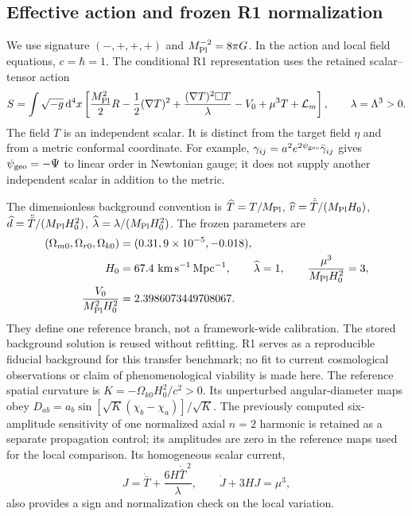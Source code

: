 \subsection{Effective action and frozen R1 normalization}
We use signature $(-,+,+,+)$ and $M_{\rm Pl}^{-2}=8\pi G$.
In the action and local field equations, $c=\hbar=1$.
The conditional R1 representation uses the retained scalar--tensor action
\begin{equation}
 S=\int \sqrt{-g}\,\mathrm d^4x\left[
 \frac{M_{\rm Pl}^2}{2}R-\frac12(\nabla T)^2
 +\frac{(\nabla T)^2\Box T}{\lambda}
 -V_0+\mu^3 T+\mathcal L_m\right],
 \qquad \lambda=\Lambda^3>0 .
 \label{eq:r1-action}
\end{equation}
The field $T$ is an independent scalar. It is distinct from the target field $\eta$ and from a metric conformal coordinate. For example,
$\gamma_{ij}=a^2e^{2\psi_{\rm geo}}\bar\gamma_{ij}$ gives
$\psi_{\rm geo}=-\Psi$ to linear order in Newtonian gauge; it does not
supply another independent scalar in addition to the metric.

The dimensionless background convention is
$\widehat T=T/M_{\rm Pl}$,
$\widehat v=\dot{\bar T}/(M_{\rm Pl} H_0)$,
$\widehat d=\ddot{\bar T}/(M_{\rm Pl} H_0^2)$,
$\widehat\lambda=\lambda/(M_{\rm Pl} H_0^2)$.
The frozen parameters are
\begin{align}
 (\Omega_{m0},\Omega_{r0},\Omega_{k0})&=(0.31,9\times10^{-5},-0.018),\nonumber\\
 H_0&=67.4\ {\rm km\,s^{-1}\,Mpc^{-1}},\qquad
 \widehat\lambda=1,\qquad \frac{\mu^3}{M_{\rm Pl} H_0^2}=3,\nonumber\\
 \frac{V_0}{M_{\rm Pl}^2H_0^2}&=2.3986073449708067 .
 \label{eq:freeze}
\end{align}
They define one reference branch, not a framework-wide calibration.
The stored background solution is reused without refitting.
R1 serves as a reproducible fiducial background for this transfer
benchmark; no fit to current cosmological observations or claim of
phenomenological viability is made here.
The reference spatial curvature is
$K=-\Omega_{k0}H_0^2/c^2>0$. Its unperturbed angular-diameter maps obey
$D_{ab}=a_b\sin[\sqrt K(\chi_b-\chi_a)]/\sqrt K$.
The previously computed six-amplitude sensitivity of one normalized axial
$n=2$ harmonic is retained as a separate propagation control; its
amplitudes are zero in the reference maps used for the local comparison.
Its homogeneous scalar current,
\begin{equation}
 J=\dot{\bar T}+\frac{6H\dot{\bar T}^{\,2}}{\lambda},
 \qquad \dot J+3HJ=\mu^3 ,
 \label{eq:current}
\end{equation}
also provides a sign and normalization check on the local variation.

